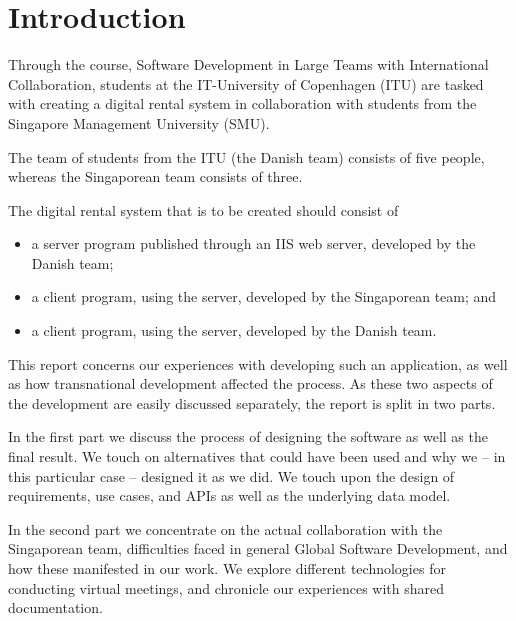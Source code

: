 \section{Introduction}

Through the course, Software Development in Large Teams with International Collaboration,
students at the IT-University of Copenhagen (ITU) are tasked with creating a digital rental
system in collaboration with students from the Singapore Management University (SMU).

The team of students from the ITU (the Danish team) consists of five people, whereas the
Singaporean team consists of three.

The digital rental system that is to be created should consist of
\begin{itemize}
    \item a server program published through an IIS web server, developed by the Danish team;
    \item a client program, using the server, developed by the Singaporean team; and
    \item a client program, using the server, developed by the Danish team.
\end{itemize}

This report concerns our experiences with developing such an application, as well as how
transnational development affected the process. As these two aspects of the development
are easily discussed separately, the report is split in two parts.

In the first part we discuss the process of designing the software as well as the final
result. We touch on alternatives that could have been used and why we – in this particular
case – designed it as we did. We touch upon the design of requirements, use cases, and APIs
as well as the underlying data model.

In the second part we concentrate on the actual collaboration with the Singaporean team,
difficulties faced in general Global Software Development, and how these manifested in
our work. We explore different technologies for conducting virtual meetings, and chronicle
our experiences with shared documentation.
